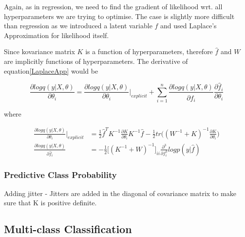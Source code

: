 \documentclass[11pt]{report}
\begin{document}
\begin{spacing}{2}
Again, as in regression, we need to find the gradient of likelihood wrt. all hyperparameters we are trying to optimise. The case is slightly more difficult than regression as we introduced a latent variable $f$ and used Laplace's Approximation for likelihood itself. 

Since kovariance matrix $K$ is a function of hyperparameters, therefore $\hat{f}$ and $W$ are implicitly functions of hyperparameters. The derivative of equation\ref{LaplaceApp} would be


\begin{equation}
\frac{\partial logq(y|X,\theta)}{\partial \theta_i} = \frac{\partial logq(y|X,\theta)}{\partial \theta_i}\bigg|_{explicit} + \sum_{i=1}^n \frac{\partial logq(y|X,\theta)}{\partial \hat{f}_i}\frac{\partial \hat{f}_i}{\partial \theta_i}
\end{equation}

where


\begin{align} 
\label{eq:al1}
\frac{\partial logq(y|X,\theta)}{\partial \theta_i}\bigg|_{explicit} &= \frac{1}{2}\hat{f}^T K^{-1}\frac{\partial K}{\partial \theta_i}K^{-1}\hat{f} - \frac{1}{2}tr\Big((W^{-1}+K)^{-1}\frac{\partial K}{\partial \theta_i}\Big) \\ 
\label{eq:al2}
\frac{\partial logq(y|X,\theta)}{\partial \hat{f}_i} &= -\frac{1}{2} \big[(K^{-1}+W)^{-1}\big]_{ii}\frac{\partial^3}{\partial f_i^3}logp(y|\hat{f})
\end{align}



\subsubsection{Predictive Class Probability}
Adding jitter - Jitters are added in the diagonal of covariance matrix to make sure that K is positive definite. 
\subsection{Multi-class Classification}


\end{spacing}
\end{document}
